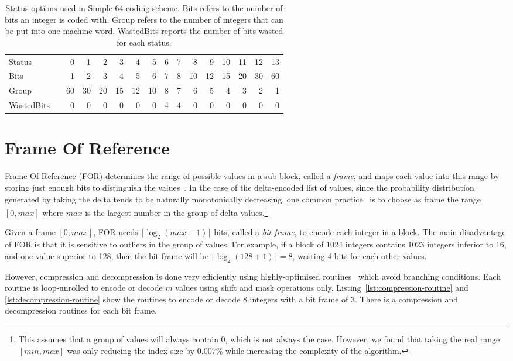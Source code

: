 \begin{table}
\centering
\begin{tabular}{lc@{\hs}rrrrrrrrrrrrrr}
\toprule
Status & \phantom{a} &0&1&2&3&4&5&6&7&8&9&10&11&12&13\\
\cmidrule{3-16}
Bits & \phantom{a} &1&2&3&4&5&6&7&8&10&12&15&20&30&60\\
Group& \phantom{a} &60&30&20&15&12&10&8&7&6&5&4&3&2&1\\
WastedBits& \phantom{a} &0&0&0&0&0&0&4&4&0&0&0&0&0&0\\
\bottomrule
\end{tabular}
\caption{Status options used in Simple-64 coding scheme. Bits refers to the
number of bits an integer is coded with. Group refers to the number of integers
that can be put into one machine word. WastedBits reports the number of bits
wasted for each status.}
\label{tab:s64-status}
\end{table}

\section{Frame Of Reference}

Frame Of Reference (FOR) determines the range of possible values in a sub-block,
called a \emph{frame}, and maps each value into this range by storing just
enough bits to distinguish the values~\cite{goldstein:1998:icde}. In
the case of the delta-encoded list of values, since the probability
distribution generated by taking the delta tends to be naturally monotonically
decreasing, one common practice~\cite{Nzukowski:2006:pfor,anh:2010:simple64}
is to choose as frame the range $[0, max]$ where $max$ is the largest number
in the group of delta values.\footnote{This assumes that a group of values
will always contain $0$, which is not always the case. However, we found that
taking the real range $[min, max]$ was only reducing the index size by 0.007\%
while increasing the complexity of the algorithm.}

Given a frame $[0, max]$, FOR needs $\lceil \log_2(max + 1) \rceil$ bits,
called a \emph{bit frame}, to encode each integer in a
block. The main disadvantage of FOR is that it is sensitive to outliers in the
group of values. For example, if a block of 1024 integers contains 1023
integers inferior to 16, and one value superior to 128, then the bit frame will
be $\lceil \log_2(128 + 1) \rceil = 8$, wasting 4 bits for each other values.

However, compression and decompression is done very efficiently using
highly-optimised routines~\cite{Nzukowski:2006:pfor} which avoid branching
conditions. Each routine is loop-unrolled to encode or decode $m$ values using
shift and mask operations only. Listing~\ref{lst:compression-routine} and
\ref{lst:decompression-routine} show the routines to encode or decode 8
integers with a bit frame of 3. There is a compression and decompression
routines for each bit frame.

